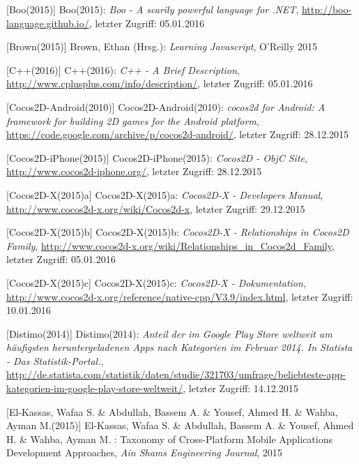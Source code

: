 \begin{thebibliography}{}
[Boo(2015)] Boo(2015): \emph{Boo - A scarily powerful language for .NET},
\url{http://boo-language.github.io/}, letzter Zugriff: 05.01.2016

[Brown(2015)] Brown, Ethan (Hrsg.): 
\emph{Learning Javascript}, O'Reilly 2015

[C++(2016)] C++(2016): \emph{C++ - A Brief Description},
\url{http://www.cplusplus.com/info/description/}, letzter Zugriff: 05.01.2016

[Cocos2D-Android(2010)] Cocos2D-Android(2010): \emph{cocos2d for Android: A framework for building 2D games for the Android platform},
\url{https://code.google.com/archive/p/cocos2d-android/}, letzter Zugriff: 28.12.2015

[Cocos2D-iPhone(2015)] Cocos2D-iPhone(2015): \emph{Cocos2D - ObjC Site},
\url{http://www.cocos2d-iphone.org/}, letzter Zugriff: 28.12.2015

[Cocos2D-X(2015)a] Cocos2D-X(2015)a: \emph{Cocos2D-X - Developers Manual},
\url{http://www.cocos2d-x.org/wiki/Cocos2d-x}, letzter Zugriff: 29.12.2015

[Cocos2D-X(2015)b] Cocos2D-X(2015)b: \emph{Cocos2D-X - Relationships in Cocos2D Family},
\url{http://www.cocos2d-x.org/wiki/Relationships_in_Cocos2d_Family}, letzter Zugriff: 05.01.2016

[Cocos2D-X(2015)c] Cocos2D-X(2015)c: \emph{Cocos2D-X - Dokumentation},
\url{http://www.cocos2d-x.org/reference/native-cpp/V3.9/index.html}, letzter Zugriff: 10.01.2016

[Distimo(2014)] Distimo(2014): \emph{Anteil der im Google Play Store weltweit am häufigsten heruntergeladenen Apps nach Kategorien im Februar 2014. In Statista - Das Statistik-Portal.},
\url{http://de.statista.com/statistik/daten/studie/321703/umfrage/beliebteste-app-kategorien-im-google-play-store-weltweit/}, letzter Zugriff: 14.12.2015

[El-Kassas, Wafaa S. \& Abdullah, Bassem A. \&  Yousef, Ahmed H. \&  Wahba, Ayman M.(2015)] El-Kassas, Wafaa S. \& Abdullah, Bassem A. \&  Yousef, Ahmed H. \&  Wahba, Ayman M. :
\glqq Taxonomy of Cross-Platform Mobile Applications Development Approaches\grqq, 
\emph{Ain Shams Engineering Journal}, 2015


\end{thebibliography}
